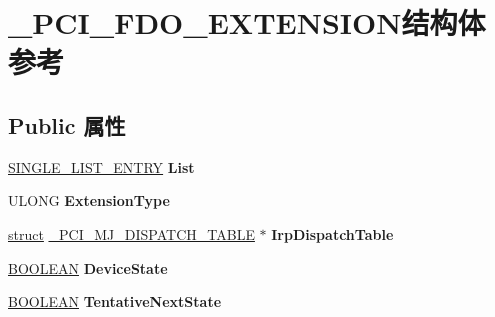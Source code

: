 \hypertarget{struct___p_c_i___f_d_o___e_x_t_e_n_s_i_o_n}{}\section{\+\_\+\+P\+C\+I\+\_\+\+F\+D\+O\+\_\+\+E\+X\+T\+E\+N\+S\+I\+O\+N结构体 参考}
\label{struct___p_c_i___f_d_o___e_x_t_e_n_s_i_o_n}
\subsection*{Public 属性}
\begin{DoxyCompactItemize}
\item 
\mbox{\label{struct___p_c_i___f_d_o___e_x_t_e_n_s_i_o_n_aaf18a252986dce06d0063bee55aa1e68}} 
\hyperlink{struct___s_i_n_g_l_e___l_i_s_t___e_n_t_r_y}{S\+I\+N\+G\+L\+E\+\_\+\+L\+I\+S\+T\+\_\+\+E\+N\+T\+RY} {\bfseries List}
\item 
\mbox{\label{struct___p_c_i___f_d_o___e_x_t_e_n_s_i_o_n_a8660fcf5b8542614e793fafe572256c2}} 
U\+L\+O\+NG {\bfseries Extension\+Type}
\item 
\mbox{\label{struct___p_c_i___f_d_o___e_x_t_e_n_s_i_o_n_aae2d4e435a7d307a4df72304ebad6020}} 
\hyperlink{interfacestruct}{struct} \hyperlink{struct___p_c_i___m_j___d_i_s_p_a_t_c_h___t_a_b_l_e}{\+\_\+\+P\+C\+I\+\_\+\+M\+J\+\_\+\+D\+I\+S\+P\+A\+T\+C\+H\+\_\+\+T\+A\+B\+LE} $\ast$ {\bfseries Irp\+Dispatch\+Table}
\item 
\mbox{\label{struct___p_c_i___f_d_o___e_x_t_e_n_s_i_o_n_a010d196d7574fdd7717fd7619601084e}} 
\hyperlink{_processor_bind_8h_a112e3146cb38b6ee95e64d85842e380a}{B\+O\+O\+L\+E\+AN} {\bfseries Device\+State}
\item 
\mbox{\label{struct___p_c_i___f_d_o___e_x_t_e_n_s_i_o_n_a83c42ef73c297cb9f3a7c3f6fa33fddf}} 
\hyperlink{_processor_bind_8h_a112e3146cb38b6ee95e64d85842e380a}{B\+O\+O\+L\+E\+AN} {\bfseries Tentative\+Next\+State}
\item 
\mbox{\label{struct___p_c_i___f_d_o___e_x_t_e_n_s_i_o_n_ad1b59768a1b3b634c5982dda1713ce83}} 

\end{DoxyCompactItemize}

